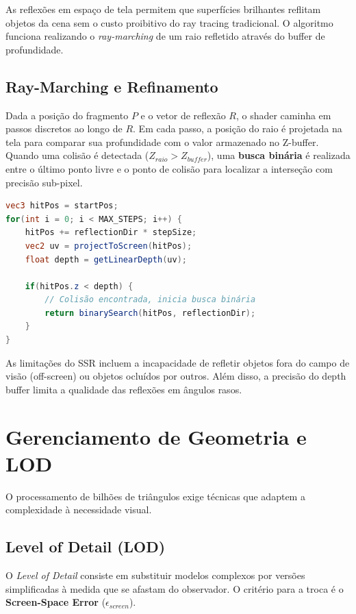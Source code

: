 As reflexões em espaço de tela permitem que superfícies brilhantes reflitam objetos da cena sem o custo proibitivo do ray tracing tradicional. O algoritmo funciona realizando o \textit{ray-marching} de um raio refletido através do buffer de profundidade.

\subsection{Ray-Marching e Refinamento}

Dada a posição do fragmento $P$ e o vetor de reflexão $R$, o shader caminha em passos discretos ao longo de $R$. Em cada passo, a posição do raio é projetada na tela para comparar sua profundidade com o valor armazenado no Z-buffer. Quando uma colisão é detectada ($Z_{raio} > Z_{buffer}$), uma \textbf{busca binária} é realizada entre o último ponto livre e o ponto de colisão para localizar a interseção com precisão sub-pixel.

\begin{lstlisting}[language=GLSL, caption=Pseudocódigo de SSR com Ray-Marching]
vec3 hitPos = startPos;
for(int i = 0; i < MAX_STEPS; i++) {
    hitPos += reflectionDir * stepSize;
    vec2 uv = projectToScreen(hitPos);
    float depth = getLinearDepth(uv);
    
    if(hitPos.z < depth) {
        // Colisão encontrada, inicia busca binária
        return binarySearch(hitPos, reflectionDir);
    }
}
\end{lstlisting}

As limitações do SSR incluem a incapacidade de refletir objetos fora do campo de visão (off-screen) ou objetos ocluídos por outros. Além disso, a precisão do depth buffer limita a qualidade das reflexões em ângulos rasos.

\section{Gerenciamento de Geometria e LOD}

O processamento de bilhões de triângulos exige técnicas que adaptem a complexidade à necessidade visual.

\subsection{Level of Detail (LOD)}

O \textit{Level of Detail} consiste em substituir modelos complexos por versões simplificadas à medida que se afastam do observador. O critério para a troca é o \textbf{Screen-Space Error} ($\epsilon_{screen}$).

